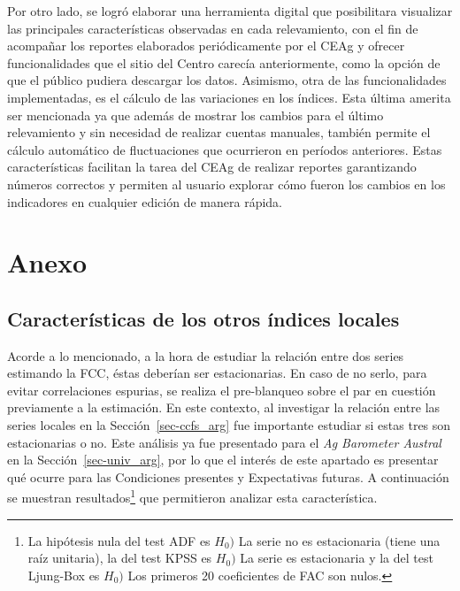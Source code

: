 \documentclass[12pt]{article}
\begin{document}
Por otro lado, se logró elaborar una herramienta digital que
posibilitara visualizar las principales características observadas en
cada relevamiento, con el fin de acompañar los reportes elaborados
periódicamente por el CEAg y ofrecer funcionalidades que el sitio del
Centro carecía anteriormente, como la opción de que el público pudiera
descargar los datos. Asimismo, otra de las funcionalidades
implementadas, es el cálculo de las variaciones en los índices. Esta
última amerita ser mencionada ya que además de mostrar los cambios para
el último relevamiento y sin necesidad de realizar cuentas manuales,
también permite el cálculo automático de fluctuaciones que ocurrieron en
períodos anteriores. Estas características facilitan la tarea del CEAg
de realizar reportes garantizando números correctos y permiten al
usuario explorar cómo fueron los cambios en los indicadores en cualquier
edición de manera rápida.

\newpage

\section{Anexo}\label{anexo}

\subsection{Características de los otros índices
locales}\label{sec-carcs_indices_arg}

Acorde a lo mencionado, a la hora de estudiar la relación entre dos
series estimando la FCC, éstas deberían ser estacionarias. En caso de no
serlo, para evitar correlaciones espurias, se realiza el pre-blanqueo
sobre el par en cuestión previamente a la estimación. En este contexto,
al investigar la relación entre las series locales en la
Sección~\ref{sec-ccfs_arg} fue importante estudiar si estas tres son
estacionarias o no. Este análisis ya fue presentado para el \emph{Ag
Barometer Austral} en la Sección~\ref{sec-univ_arg}, por lo que el
interés de este apartado es presentar qué ocurre para las Condiciones
presentes y Expectativas futuras. A continuación se muestran
resultados\footnote{La hipótesis nula del test ADF es \(H_0)\) La serie
  no es estacionaria (tiene una raíz unitaria), la del test KPSS es
  \(H_0)\) La serie es estacionaria y la del test Ljung-Box es \(H_0)\)
  Los primeros 20 coeficientes de FAC son nulos.} que permitieron
analizar esta característica.
\end{document}
